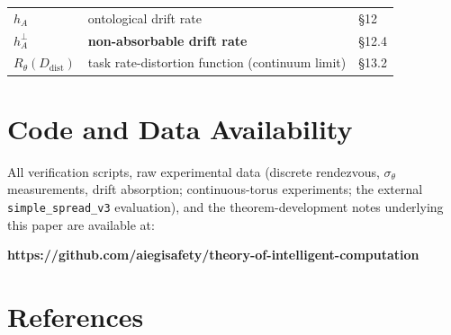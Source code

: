 \documentclass[11pt]{article}
\begin{document}
\begin{longtable}[]{@{}lll@{}}
\begin{minipage}[t]{0.30\columnwidth}\raggedright
\(h_A\)\strut
\end{minipage} & \begin{minipage}[t]{0.30\columnwidth}\raggedright
ontological drift rate\strut
\end{minipage} & \begin{minipage}[t]{0.30\columnwidth}\raggedright
\S{}12\strut
\end{minipage}\tabularnewline
\begin{minipage}[t]{0.30\columnwidth}\raggedright
\(h_A^\perp\)\strut
\end{minipage} & \begin{minipage}[t]{0.30\columnwidth}\raggedright
\textbf{non-absorbable drift rate}\strut
\end{minipage} & \begin{minipage}[t]{0.30\columnwidth}\raggedright
\S{}12.4\strut
\end{minipage}\tabularnewline
\begin{minipage}[t]{0.30\columnwidth}\raggedright
\(R_\theta(D_{\mathrm{dist}})\)\strut
\end{minipage} & \begin{minipage}[t]{0.30\columnwidth}\raggedright
task rate-distortion function (continuum limit)\strut
\end{minipage} & \begin{minipage}[t]{0.30\columnwidth}\raggedright
\S{}13.2\strut
\end{minipage}\tabularnewline
\bottomrule
\end{longtable}

\hypertarget{code-and-data-availability}{%
\section{Code and Data Availability}\label{code-and-data-availability}}

All verification scripts, raw experimental data (discrete rendezvous, \(\sigma_\theta\) measurements, drift absorption; continuous-torus experiments; the external \texttt{simple\_spread\_v3} evaluation), and the theorem-development notes underlying this paper are available at:

\textbf{https://github.com/aiegisafety/theory-of-intelligent-computation}

\hypertarget{references}{%
\section*{References}\label{references}}
\end{document}
